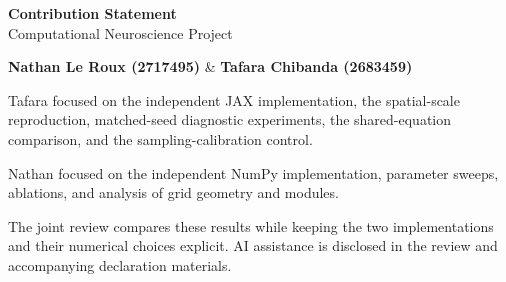 \documentclass[11pt,a4paper]{article}
\begin{document}
\raggedright

\begin{center}
    {\Large\bfseries Contribution Statement}\\[0.6em]
    Computational Neuroscience Project
\end{center}

\textbf{Nathan Le Roux (2717495)} \& \textbf{Tafara Chibanda (2683459)}

Tafara focused on the independent JAX implementation, the spatial-scale
reproduction, matched-seed diagnostic experiments, the shared-equation
comparison, and the sampling-calibration control.

Nathan focused on the independent NumPy implementation, parameter sweeps,
ablations, and analysis of grid geometry and modules.

The joint review compares these results while keeping the two implementations
and their numerical choices explicit. AI assistance is disclosed in the review
and accompanying declaration materials.
\end{document}
